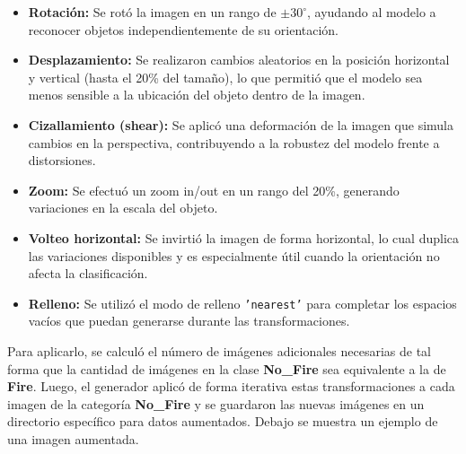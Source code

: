 \begin{itemize}
    \item \textbf{Rotación:} Se rotó la imagen en un rango de $\pm30^\circ$, ayudando al modelo a 
    reconocer objetos independientemente de su orientación.
    \item \textbf{Desplazamiento:} Se realizaron cambios aleatorios en la posición horizontal y 
    vertical (hasta el 20\% del tamaño), lo que permitió que el modelo sea menos sensible a la 
    ubicación del objeto dentro de la imagen.
    \item \textbf{Cizallamiento (shear):} Se aplicó una deformación de la imagen que simula cambios en la perspectiva, 
    contribuyendo a la robustez del modelo frente a distorsiones.
    \item \textbf{Zoom:} Se efectuó un zoom in/out en un rango del 20\%, generando variaciones en la escala del objeto.
    \item \textbf{Volteo horizontal:} Se invirtió la imagen de forma horizontal, lo cual duplica 
    las variaciones disponibles y es especialmente útil cuando la orientación no afecta la clasificación.
    \item \textbf{Relleno:} Se utilizó el modo de relleno \texttt{'nearest'} para completar los espacios 
    vacíos que puedan generarse durante las transformaciones.
\end{itemize}

Para aplicarlo, se calculó el número de imágenes adicionales necesarias de tal forma que la cantidad de 
imágenes en la clase \textbf{No\_Fire} sea equivalente a la de \textbf{Fire}. Luego, 
el generador aplicó de forma iterativa estas transformaciones a cada imagen de la categoría \textbf{No\_Fire} y se 
guardaron las nuevas imágenes en un directorio específico para datos aumentados. Debajo se muestra un 
ejemplo de una imagen aumentada.

